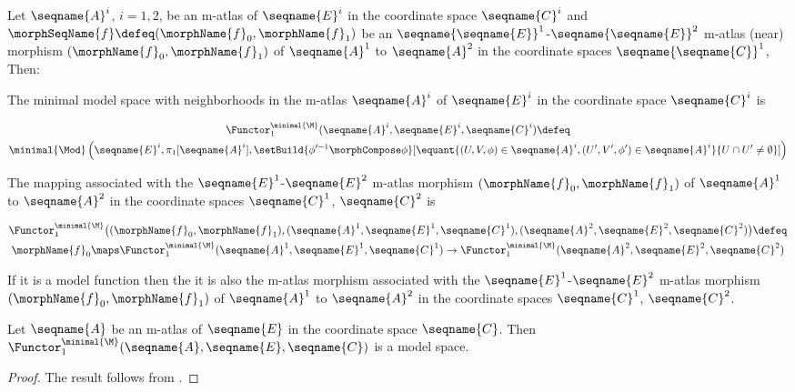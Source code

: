 \documentclass{article}
\begin{document}
\begin{definition}
\label{def:M-modE}
Let $\seqname{A}^i$, $i=1,2$, be an m-atlas of $\seqname{E}^i$ in the
coordinate space $\seqname{C}^i$ and
$\morphSeqName{f} \defeq (\morphName{f}_0,\morphName{f}_1)$ be an
$\seqname{\seqname{E}}^1$-$\seqname{\seqname{E}}^2$ m-atlas (near)
morphism $(\morphName{f}_0,\morphName{f}_1)$ of $\seqname{A}^1$ to
$\seqname{A}^2$ in the coordinate spaces $\seqname{\seqname{C}}^1$,
Then:

The minimal model space with neighborhoods in the m-atlas
$\seqname{A}^i$ of $\seqname{E}^i$ in the coordinate space
$\seqname{C}^i$ is

\begin{multline}
\Functor^{\minimal{\M}}_1 (\seqname{A}^i, \seqname{E}^i, \seqname{C}^i)
\defeq \\
\minimal{\Mod}
  \left (
    \seqname{E}^i,
    \pi_1[\seqname{A}^i],
    \setBuild
      {\phi'^{-1} \morphCompose \phi}%
      [
        \equant
          {
            {(U,V,\phi) \in \seqname{A}^i},
            {(U',V',\phi') \in \seqname{A}^i}
          }
          {
            U \cap U' \ne \emptyset
          }
      ]
  \right )
\end{multline}

The mapping associated with the $\seqname{E}^1$-$\seqname{E}^2$
m-atlas morphism $(\morphName{f}_0,\morphName{f}_1)$ of
$\seqname{A}^1$ to $\seqname{A}^2$ in the coordinate spaces
$\seqname{C}^1$, $\seqname{C}^2$ is

\begin{multline}
\Functor^{\minimal{\M}}_1
  \bigl (
    (
      \morphName{f}_0,
      \morphName{f}_1
    ),
    (\seqname{A}^1, \seqname{E}^1, \seqname{C}^1),
    (\seqname{A}^2, \seqname{E}^2, \seqname{C}^2)
  \bigr )
\defeq \\
  \morphName{f}_0
  \maps
  \Functor^{\minimal{\M}}_1 (\seqname{A}^1, \seqname{E}^1, \seqname{C}^1)
  \to
  \Functor^{\minimal{\M}}_1 (\seqname{A}^2, \seqname{E}^2, \seqname{C}^2)
\end{multline}

If it is a model function then the it is also the m-atlas morphism
associated with the $\seqname{E}^1$-$\seqname{E}^2$ m-atlas morphism
$(\morphName{f}_0,\morphName{f}_1)$ of $\seqname{A}^1$ to $\seqname{A}^2$
in the coordinate spaces $\seqname{C}^1$, $\seqname{C}^2$.
\end{definition}

\begin{lemma}
\label{lem:M-ismodE}
Let $\seqname{A}$ be an m-atlas of $\seqname{E}$ in the coordinate space
$\seqname{C}$. Then
$\Functor^{\minimal{\M}}_1 (\seqname{A}, \seqname{E}, \seqname{C})$ is a
model space.

\begin{proof}
The result follows from .
\end{proof}
\end{lemma}
\end{document}
